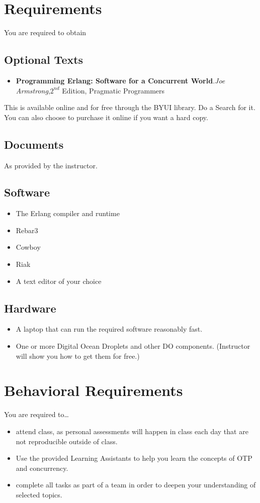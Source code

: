 \documentclass[12pt]{amsart}
\begin{document}
\section{Requirements}
You are required to obtain
\subsection{Optional Texts}
	\begin{itemize}
	\item \textbf{Programming Erlang: Software for a Concurrent World}.\textit{Joe Armstrong},$2^{nd}$ Edition, Pragmatic Programmers
	\end{itemize}
	This is available online and for free through the BYUI library. Do a Search for it. You can also choose to purchase it online if you want a hard copy.
\subsection{Documents} As provided by the instructor.
\subsection{Software}
	\begin{itemize}
		\item The Erlang compiler and runtime
		\item Rebar3
		\item Cowboy
		\item Riak
		\item A text editor of your choice
	\end{itemize}
\subsection{Hardware}
	\begin{itemize}
		\item A laptop that can run the required software reasonably fast.
		\item One or more Digital Ocean Droplets and other DO components. (Instructor will show you how to get them for free.)
	\end{itemize}
\section{Behavioral Requirements}

You are required to\ldots
\begin{itemize}
\item attend class, as personal assessments will happen in class each day that are not reproducible outside of class.
\item Use the provided Learning Assistants to help you learn the concepts of OTP and concurrency.
\item complete all tasks as part of a team in order to deepen your understanding of selected topics.
\end{itemize}
\end{document}
